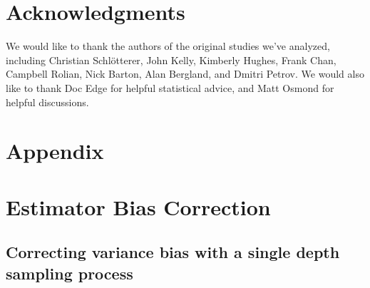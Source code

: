 \documentclass[11pt]{article}
\DeclareMathOperator{\cov}{Cov}
\begin{document}









\section{Acknowledgments} 

We would like to thank the authors of the original studies we've analyzed,
including Christian Schl{\"o}tterer, John Kelly, Kimberly Hughes, Frank Chan,
Campbell Rolian, Nick Barton, Alan Bergland, and Dmitri Petrov.  We would also
like to thank Doc Edge for helpful statistical advice, and Matt Osmond for
helpful discussions. 


\section{Appendix}

\section{Estimator Bias Correction}
\subsection{Correcting variance bias with a single depth sampling process}
\label{supp:depth-var-corr}
\end{document}
